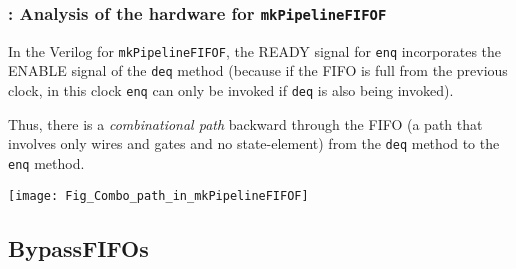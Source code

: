\begin{frame}[fragile]
\frametitle{{\BSV}: Analysis of the hardware for {\tt mkPipelineFIFOF}}

\footnotesize

In the Verilog for \verb|mkPipelineFIFOF|, the READY signal
for \verb|enq| incorporates the ENABLE signal of the \verb|deq| method
(because if the FIFO is full from the previous clock, in this
clock \verb|enq| can only be invoked if \verb|deq| is also being
invoked).

\vspace{2ex}

Thus, there is a \emph{combinational path} backward through the FIFO
(a path that involves only wires and gates and no state-element) from
the \verb|deq| method to the \verb|enq| method.

\vspace{2ex}

\begin{center}
  \texttt{[image: Fig\_Combo\_path\_in\_mkPipelineFIFOF]}
\end{center}

\end{frame}


\subsection{BypassFIFOs}

